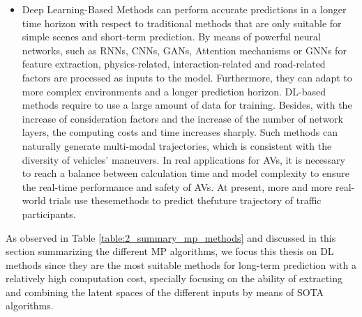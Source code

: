 \begin{itemize}
	\item Deep Learning-Based Methods can perform accurate predictions in a longer time horizon with respect to traditional methods that are only suitable for simple scenes and short-term prediction. By means of powerful neural networks, such as RNNs, CNNs, GANs, Attention mechanisms or GNNs for feature extraction, physics-related, interaction-related and road-related factors are processed as inputs to the model. Furthermore, they can adapt to more complex environments and a longer prediction horizon. \ac{DL}-based methods require to use a large amount of data for training. Besides, with the increase of consideration factors and the increase of the number of network layers, the computing costs and time increases sharply. Such methods can naturally generate multi-modal trajectories, which is consistent with the diversity of vehicles’ maneuvers. In real applications for AVs, it is necessary to reach a balance between calculation time and model complexity to ensure the real-time performance and safety of AVs. At present, more and more real-world trials use thesemethods to predict thefuture trajectory of traffic participants.
\end{itemize}	
	
As observed in Table \ref{table:2_summary_mp_methods} and discussed in this section summarizing the different \ac{MP} algorithms, we focus this thesis on \ac{DL} methods since they are the most suitable methods for long-term prediction with a relatively high computation cost, specially focusing on the ability of extracting and combining the latent spaces of the different inputs by means of \ac{SOTA} algorithms.